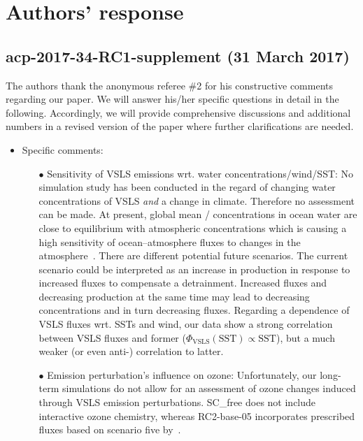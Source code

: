 \thispagestyle{empty}
\section*{Authors' response}
\subsection*{{\color{blue}acp-2017-34-RC1-supplement (31 March 2017)}}
The authors thank the anonymous referee \#2 for his constructive comments regarding our paper. We will answer his/her specific questions in detail in the following. Accordingly, we will provide comprehensive discussions and additional numbers in a revised version of the paper where further clarifications are needed.
\begin{itemize}
\item Specific comments:
  \begin{itemize}
  \item[$\bullet$]{\color{blue}Sensitivity of VSLS emissions wrt. water concentrations/wind/SST:} No simulation study has been conducted in the regard of changing water concentrations of VSLS \emph{and} a change in climate. Therefore no assessment can be made. At present, global mean / concentrations in ocean water are close to equilibrium with atmospheric concentrations which is causing a high sensitivity of ocean--atmosphere fluxes to changes in the atmosphere~\citep{ACP:Lennartz2015}. There are different potential future scenarios. The current scenario could be interpreted as an increase in production in response to increased fluxes to compensate a detrainment. Increased fluxes and decreasing production at the same time may lead to decreasing concentrations and in turn decreasing fluxes. Regarding a dependence of VSLS fluxes wrt. SSTs and wind, our data show a strong correlation between VSLS fluxes and former ($\Phi_\text{VSLS}(\text{SST})\propto \text{SST}$), but a much weaker (or even anti-) correlation to latter.
  \item[$\bullet$]{\color{blue}Emission perturbation's influence on ozone:} Unfortunately, our long-term simulations do not allow for an assessment of ozone changes induced through VSLS emission perturbations. SC\_free does not include interactive ozone chemistry, whereas RC2-base-05 incorporates prescribed fluxes based on scenario five by~\citet{JGR:Warwick2006}.

\end{itemize}
\end{itemize}

